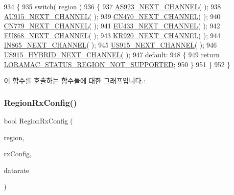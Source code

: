 \begin{DoxyCode}
934 \{
935     \textcolor{keywordflow}{switch}( region )
936     \{
937         \mbox{\hyperlink{_region_8c_ac09ba658790d3e4184c2425642a80831}{AS923\_NEXT\_CHANNEL}}( );
938         \mbox{\hyperlink{_region_8c_aa574e30f345878b97922aea01895a22c}{AU915\_NEXT\_CHANNEL}}( );
939         \mbox{\hyperlink{_region_8c_af520ce122a5bdc67162e543ecd73e25d}{CN470\_NEXT\_CHANNEL}}( );
940         \mbox{\hyperlink{_region_8c_a8f32f723130114c571f006ca26a1fd1c}{CN779\_NEXT\_CHANNEL}}( );
941         \mbox{\hyperlink{_region_8c_aa7515e1470cb7f1e7fca9ae72049b898}{EU433\_NEXT\_CHANNEL}}( );
942         \mbox{\hyperlink{_region_8c_a4e2f3569361ac1903dbf503348d11533}{EU868\_NEXT\_CHANNEL}}( );
943         \mbox{\hyperlink{_region_8c_ab48cb9a119c38d8457aaaaac502609ef}{KR920\_NEXT\_CHANNEL}}( );
944         \mbox{\hyperlink{_region_8c_a5e43ab6db5f02271d5719785b3246fce}{IN865\_NEXT\_CHANNEL}}( );
945         \mbox{\hyperlink{_region_8c_a75ddbad2541ac4fb8f01c51e26f4295d}{US915\_NEXT\_CHANNEL}}( );
946         \mbox{\hyperlink{_region_8c_ae724fce9fe182dad0cafe88662e886a4}{US915\_HYBRID\_NEXT\_CHANNEL}}( );
947         \textcolor{keywordflow}{default}:
948         \{
949             \textcolor{keywordflow}{return} \mbox{\hyperlink{group___l_o_r_a_m_a_c_gga1d18f26b344040b3ec5c3db662919661af424839424174be5fc5e52e00160940e}{LORAMAC\_STATUS\_REGION\_NOT\_SUPPORTED}};
950         \}
951     \}
952 \}
\end{DoxyCode}
이 함수를 호출하는 함수들에 대한 그래프입니다.\+:
\mbox{\label{group___r_e_g_i_o_n_gaf89984d30239d6597190409068031465}} 
\subsubsection{\texorpdfstring{Region\+Rx\+Config()}{RegionRxConfig()}}
{\footnotesize\ttfamily bool Region\+Rx\+Config (\begin{DoxyParamCaption}\item[{\mbox{\hyperlink{group___l_o_r_a_m_a_c_ga80c48efda9ae02e14b58160d34a798dd}{Lo\+Ra\+Mac\+Region\+\_\+t}}}]{region,  }\item[{\mbox{\hyperlink{group___r_e_g_i_o_n_ga375c038078dfcfc7ef14280021db719e}{Rx\+Config\+Params\+\_\+t}} $\ast$}]{rx\+Config,  }\item[{int8\+\_\+t $\ast$}]{datarate }\end{DoxyParamCaption})}




